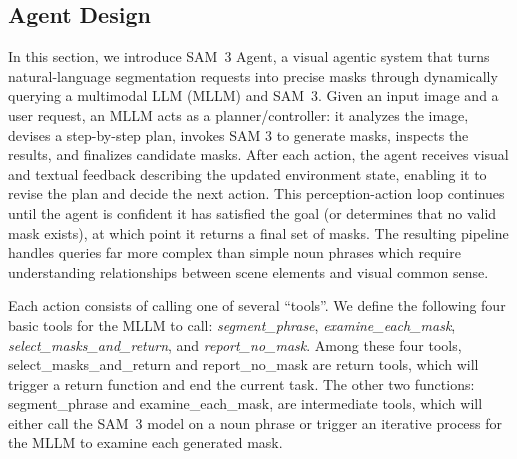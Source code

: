 \documentclass[]{fairmeta}
\newcommand{\model}{SAM~3\xspace}
\begin{document}
\subsection{Agent Design}

In this section, we introduce \model Agent, a visual agentic system that turns natural-language segmentation requests into precise masks through dynamically querying a multimodal LLM (MLLM) and \model. Given an input image and a user request, an MLLM acts as a planner/controller: it analyzes the image, devises a step-by-step plan, invokes SAM 3 to generate masks, inspects the results, and finalizes candidate masks. After each action, the agent receives visual and textual feedback describing the updated environment state, enabling it to revise the plan and decide the next action. This perception-action loop continues until the agent is confident it has satisfied the goal (or determines that no valid mask exists), at which point it returns a final set of masks. The resulting pipeline handles queries far more complex than simple noun phrases which require understanding relationships between scene elements and visual common sense.

Each action consists of calling one of several ``tools''.
We define the following four basic tools for the MLLM to call: \emph{segment\_phrase}, \emph{examine\_each\_mask}, \emph{select\_masks\_and\_return}, and \emph{report\_no\_mask}. Among these four tools, select\_masks\_and\_return and report\_no\_mask are return tools, which will trigger a return function and end the current task. The other two functions: segment\_phrase and examine\_each\_mask, are intermediate tools, which will either call the \model model on a noun phrase or trigger an iterative process for the MLLM to examine each generated mask.

\vspace{1.5em}
\end{document}
